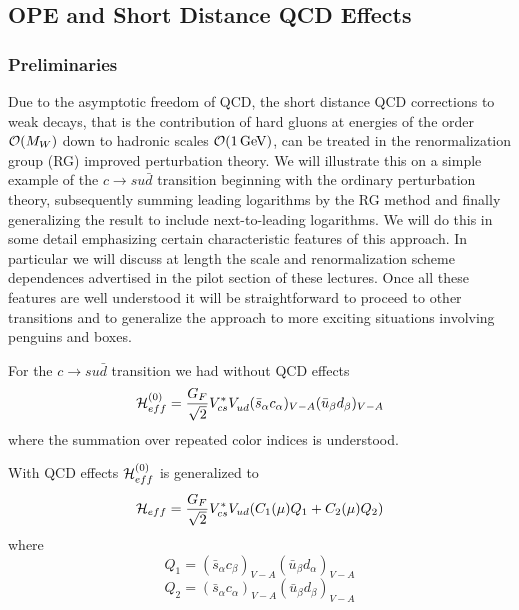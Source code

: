 \documentclass[12pt,rotate]{article}
\newcommand{\gev}{\, {\rm GeV}}
\newcommand{\ord}{{\cal O}}
\begin{document}
\begin{itemize}
\begin{itemize}
\begin{itemize}
\subsection{OPE and Short Distance QCD Effects}
            \label{sec:basicform:ope}
\subsubsection{Preliminaries}
Due to the asymptotic freedom of QCD, the short distance
QCD corrections to weak decays, that is the contribution
of hard gluons at energies of the order $\ord(M_W)$ down to hadronic
scales $\ord(1\gev)$, can be treated  in 
the renormalization group (RG) improved perturbation theory. 
We will illustrate this on a simple example of the
$c\to su\bar d$ transition beginning with the ordinary
perturbation theory, subsequently summing leading logarithms
by the RG method and finally generalizing the result to include
next-to-leading logarithms. We will do this in some detail
emphasizing certain characteristic features of this approach.
In particular we will discuss at length the scale and
renormalization scheme dependences advertised in the pilot
section of these lectures. Once all these features are well
understood it will be straightforward to proceed to other
transitions and to generalize the approach to more exciting
situations involving penguins and boxes.

For the $c\to su\bar d$ transition we had without QCD effects
\begin{equation}\label{amp0}
{\cal H}^{(0)}_{eff}={G_F\over\sqrt{2}}V^*_{cs}V_{ud}^{}
  (\bar s_\alpha c_\alpha)_{V-A}(\bar u_\beta d_\beta)_{V-A}
\end{equation}
where the summation over repeated color indices is understood.  

With QCD effects ${\cal H}^{(0)}_{eff}$ is generalized to
\begin{equation}\label{hq12}
{\cal H}_{eff}={G_F\over\sqrt{2}}V^\ast_{cs}V_{ud}
(C_1(\mu) Q_1+C_2(\mu) Q_2) 
\end{equation}
where
\begin{equation}\label{q1c} Q_1=
(\bar s_\alpha c_\beta)_{V-A}(\bar u_\beta d_\alpha)_{V-A}  
 \end{equation}
\begin{equation}\label{q2c} Q_2
=(\bar s_\alpha c_\alpha)_{V-A}(\bar u_\beta d_\beta)_{V-A}
  \end{equation}


\end{itemize}
\end{itemize}
\end{itemize}
\end{document}
